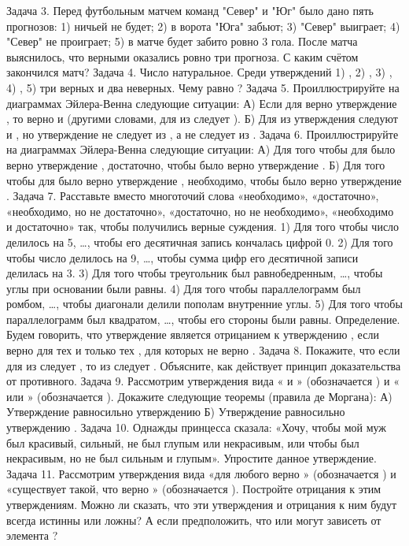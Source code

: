 \documentclass[a4paper,11pt]{article}
\begin{document}
Задача 3. Перед футбольным матчем команд "Север" и "Юг" было дано пять прогнозов:  
1) ничьей не будет; 2) в ворота "Юга" забьют;  3) "Север" выиграет;  4) "Север" не проиграет; 5) в матче будет забито ровно 3 гола. После матча выяснилось, что верными оказались ровно три прогноза. С каким счётом закончился матч?
Задача 4. Число   натуральное. Среди утверждений 1)  , 2)  , 3)  , 4)  , 5)   три верных и два неверных. Чему равно  ?
Задача 5. Проиллюстрируйте на диаграммах Эйлера-Венна следующие ситуации:
А) Если для   верно утверждение , то верно и   (другими словами, для   из   следует  ).
Б) Для  из утверждения следуют   и  , но утверждение не следует из  , а   не следует из  .
Задача 6. Проиллюстрируйте на диаграммах Эйлера-Венна следующие ситуации:
А) Для того чтобы для   было верно утверждение  , достаточно, чтобы было верно утверждение  .
Б) Для того чтобы для   было верно утверждение  , необходимо, чтобы было верно утверждение  .
Задача 7. Расставьте вместо многоточий слова «необходимо», «достаточно», «необходимо, но не достаточно», «достаточно, но не необходимо», «необходимо и достаточно» так, чтобы получились верные суждения.
1)	Для того чтобы число   делилось на 5, …, чтобы его десятичная запись кончалась цифрой 0.
2)	Для того чтобы число   делилось на 9, …, чтобы сумма цифр его десятичной записи делилась на 3.
3)	Для того чтобы треугольник   был равнобедренным, …, чтобы углы при основании были равны.
4)	Для того чтобы параллелограмм   был ромбом, …, чтобы диагонали делили пополам внутренние углы.
5)	Для того чтобы параллелограмм   был квадратом, …, чтобы его стороны были равны.
Определение. Будем говорить, что утверждение   является отрицанием к утверждению  , если   верно для тех и только тех  , для которых не верно  .
Задача 8. Покажите, что если для   из   следует  , то из   следует  . 
Объясните, как действует принцип доказательства от противного.
Задача 9. Рассмотрим утверждения вида «  и  » (обозначается  ) и «  или  » (обозначается  ). Докажите следующие теоремы (правила де Моргана): А) Утверждение   равносильно утверждению  
Б) Утверждение   равносильно утверждению  .
Задача 10. Однажды принцесса сказала: «Хочу, чтобы мой муж был красивый, сильный, не был глупым или некрасивым, или чтобы был некрасивым, но не был сильным и глупым». Упростите данное утверждение.
Задача 11. Рассмотрим утверждения вида «для любого  верно  » (обозначается  ) и «существует   такой, что верно  » (обозначается  ).  Постройте отрицания к этим утверждениям. Можно ли сказать, что эти утверждения и отрицания к ним будут всегда истинны или ложны? А если предположить, что   или   могут зависеть от элемента  ?
\end{document}

